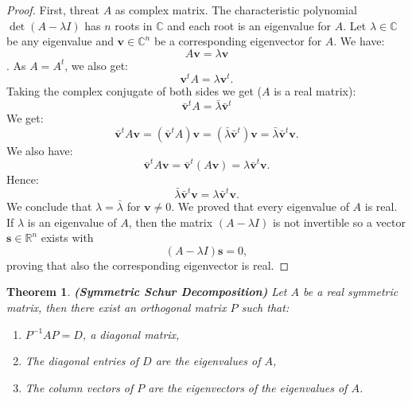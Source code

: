 \documentclass[a4paper,11pt]{report}
\newtheorem{theorem}{Theorem}[section]
\newcommand{\R}{{\mathbb R}}
\newcommand{\C}{{\mathbb C}}
\begin{document}
  \begin{proof}
    First, threat $A$ as complex matrix.
    The characteristic polynomial $\det(A-\lambda I)$ has $n$ roots in $\C$ and 
    each root is an eigenvalue for $A$. Let $\lambda \in \C$ be any eigenvalue 
    and $\mathbf{v} \in \C^n$ be a corresponding eigenvector for $A$. We have:
    $$A\mathbf{v} = \lambda\mathbf{v}$$. As $A = A^t$, we also get:
    $$\mathbf{v}^tA = \lambda \mathbf{v}^t.$$
    Taking the complex conjugate of both sides we get ($A$ is a real matrix):
    $$\bar{\mathbf{v}}^tA = \bar{\lambda}\bar{\mathbf{v}}^t$$
    We get:
    $$\bar{\mathbf{v}}^tA\mathbf{v} = (\bar{\mathbf{v}}^tA)\mathbf{v} = (\bar{\lambda}\bar{\mathbf{v}}^t)\mathbf{v} 
    = \bar{\lambda}\bar{\mathbf{v}}^t\mathbf{v}.$$
    We also have:
    $$\bar{\mathbf{v}}^tA\mathbf{v} = \bar{\mathbf{v}}^t(A\mathbf{v}) = 
    \lambda\bar{\mathbf{v}}^t\mathbf{v}.$$
    Hence:
    $$\bar{\lambda}\bar{\mathbf{v}}^t\mathbf{v} = \lambda\bar{\mathbf{v}}^t\mathbf{v}.$$
    We conclude that $\lambda = \bar{\lambda}$ for $\mathbf{v} \not = 0$. 
    We proved that every eigenvalue of $A$ is real. If $\lambda$ is an 
    eigenvalue of $A$, then the matrix $(A - \lambda I)$ is not invertible so a 
    vector $\mathbf{s} \in \R^n$ exists with $$(A - \lambda I)\mathbf{s} = 0,$$ 
    proving that also the corresponding eigenvector is real.
    
  \end{proof}
\begin{theorem}\label{diagonaal}\textbf{(Symmetric Schur Decomposition)}
  Let $A$ be a real symmetric matrix, then there exist an orthogonal 
  matrix $P$ such that:
  \begin{enumerate}
    \item[(i)] $P^{-1}AP = D$, a diagonal matrix,
    \item[(ii)] The diagonal entries of $D$ are the eigenvalues of $A$,
    \item[(iii)] The column vectors of $P$ are the eigenvectors of the 
    eigenvalues of $A$.
  \end{enumerate}
\end{theorem}
\end{document}
